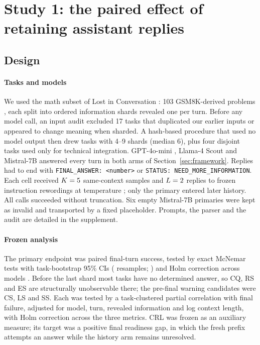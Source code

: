\section{Study 1: the paired effect of retaining assistant replies}
\label{sec:study1}

\subsection{Design}

\paragraph{Tasks and models}
We used the math subset of Lost in Conversation \citep{laban2025lost}: 103
GSM8K-derived problems \citep{cobbe2021training}, each split into ordered
information shards revealed one per turn. Before any model call, an input audit
excluded 17 tasks that duplicated our earlier inputs or appeared to change
meaning when sharded. A hash-based procedure that used no model output then
drew \nTasks{} tasks with 4--9 shards (median 6), plus four disjoint tasks used
only for technical integration. GPT-4o-mini \citep{openai2024gpt4o}, Llama-4
Scout and Mistral-7B \citep{jiang2023mistral} answered every turn in both arms
of Section~\ref{sec:framework}. Replies had to end with
\texttt{FINAL\_ANSWER: <number>} or \texttt{STATUS: NEED\_MORE\_INFORMATION}.
Each cell received $K=5{}$ same-context samples and $L=2{}$ replies to
frozen instruction rewordings at temperature \Ktemp{}; only the primary entered
later history. All \nRecords{} calls succeeded without truncation. Six empty
Mistral-7B primaries were kept as invalid and transported by a fixed
placeholder. Prompts, the parser and the audit are detailed in the supplement.

\paragraph{Frozen analysis}
The primary endpoint was paired final-turn success, tested by exact McNemar
tests \citep{mcnemar1947note} with task-bootstrap 95\% CIs (\nPermutations{}
resamples; \citealp{efron1979bootstrap}) and Holm correction across models
\citep{holm1979simple}. Before the last shard most tasks have no determined
answer, so CQ, RS and ES are structurally unobservable there; the pre-final
warning candidates were CS, LS and SS. Each was tested by a task-clustered
partial correlation with final failure, adjusted for model, turn, revealed
information and log context length, with Holm correction across the three
metrics. CRL was frozen as an auxiliary measure; its target was a positive
final readiness gap, in which the fresh prefix attempts an answer while the
history arm remains unresolved.

